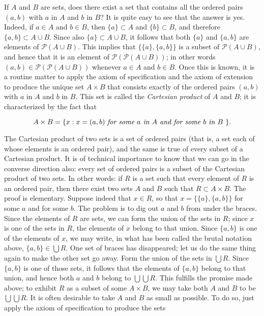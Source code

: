 If $A$ and $B$ are sets, does there exist a set that contains all the ordered pairs $(a,b)$ with $a$ in $A$ and $b$ in $B$? It is quite easy to see that the answer is yes. Indeed, if $a \in A$ and $b \in B$, then $ \{ a \} \subset A$ and $ \{ b \}  \subset B$, and therefore $ \{ a, b \} \subset A \cup B$. Since also $ \{ a \} \subset A \cup B$, it follows that both $ \{ a \}$ and $ \{ a, b \} $ are elements of $ \mathcal{P} (A \cup B)$. This implies that $ \{ \{ a \}, \{ a,b \} \} $ is a subset of $ \mathcal{P} (A \cup B) $, and hence that it is an element of $ \mathcal{P} ( \mathcal{P} (A \cup B))$; in other words $(a, b) \in \mathcal{P} ( \mathcal{P} (A \cup B))$ whenever $ a \in  A$ and $ b \in B$. Once this is known, it is a routine matter to apply the axiom of specification and the axiom of extension to produce the unique set $A \times B$ that consists exactly of the ordered pairs $(a, b)$ with $a$ in $A$ and $b$ in $B$. This set is called the \textit{Cartesian product} of $A$ and $B$; it is characterized by the fact that 

\begin{equation*}
A \times B = \{ x: x = (a,b) \text{ \textit{for some $a$ in $A$ and for some $b$ in $B$} } \}.
\end{equation*}

The Cartesian product of two sets is a set of ordered pairs (that is, a set each of whose elements is an ordered pair), and the same is true of every subset of a Cartesian product. It is of technical importance to know that we can go in the converse direction also: every set of ordered pairs is a subset of the Cartesian product of two sets. In other words: if $R$ is a set such that every element of $R$ is an ordered pair, then there exist two sets $A$ and $B$ such that $R \subset A \times B $. The proof is elementary. Suppose indeed that $ x \in R$, so that $ x = \{ \{ a \}, \{ a, b \} \}$ for some $a$ and for some $b$. The problem is to dig out $a$ and $b$ from under the braces. Since the elements of $R$ are sets, we can form the union of the sets in $R$; since $x$ is one of the sets in $R$, the elements of $x$ belong to that union. Since $\{ a,b \}$ is one of the elements of $x$, we may write, in what has been called the brutal notation above, $ \{a,b \} \in \bigcup R$. One set of braces has disappeared; let us do the same thing again to make the other set go away. Form the union of the sets in $ \bigcup R$. Since $ \{ a, b \}$ is one of those sets, it follows that the elements of $ \{ a,b \}$ belong to that union, and hence both $a$ and $b$ belong to $ \bigcup \bigcup R$. This fulfills the promise made above; to exhibit $R$ as a subset of some $A \times B$, we may take both $A$ and $B$ to be $ \bigcup \bigcup R$. It is often desirable to take $A$ and $B$ as small as possible. To do so, just apply the axiom of specification to produce the sets

